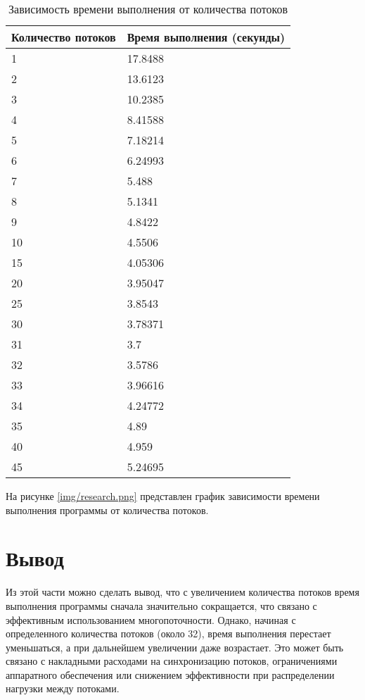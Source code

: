 \begin{table}[h!]
    \small
    \captionsetup{justification=raggedright, singlelinecheck=false, labelsep=endash}
    \caption{Зависимость времени выполнения от количества потоков}
    \label{tbl:execution_time_vs_threads}
    \begin{tabular}{|p{3cm}|p{5cm}|}
        \hline
        Количество потоков & Время выполнения (секунды) \\
        \hline
        1 & 17.8488 \\
        2 & 13.6123 \\
        3 & 10.2385 \\
        4 & 8.41588 \\
        5 & 7.18214 \\
        6 & 6.24993 \\
        7 & 5.488 \\
        8 & 5.1341 \\
        9 & 4.8422 \\
        10 & 4.5506 \\
        15 & 4.05306 \\
        20 & 3.95047 \\
        25 & 3.8543 \\
        30 & 3.78371 \\
        31 & 3.7 \\
        32 & 3.5786 \\
        33 & 3.96616 \\
        34 & 4.24772 \\
        35 & 4.89 \\
        40 & 4.959 \\
        45 & 5.24695 \\
        \hline
    \end{tabular}
\end{table}

На рисунке \ref{img/research.png} представлен график зависимости времени выполнения программы от количества потоков.

\section{Вывод}
Из этой части можно сделать вывод, что с увеличением количества потоков время выполнения программы сначала значительно сокращается, что связано с эффективным использованием многопоточности. Однако, начиная с определенного количества потоков (около 32), время выполнения перестает уменьшаться, а при дальнейшем увеличении даже возрастает. Это может быть связано с накладными расходами на синхронизацию потоков, ограничениями аппаратного обеспечения или снижением эффективности при распределении нагрузки между потоками.

